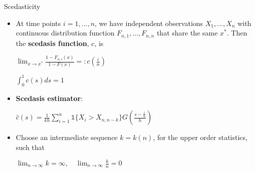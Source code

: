 \documentclass[notes]{beamer}
\begin{document}

\begin{frame}{Scedasticity}
\begin{itemize}
\item At time points $i=1, ... , n$, we have independent observations $X_1 , ... , X_n$ with continuous distribution function $F_{n,1} , ... , F_{n,n}$ that share the same $x^*$. Then the \textbf{scedasis function}, $c$, is
\begin{center} $ \displaystyle \lim_{x \rightarrow x^*} \frac{1-F_{n,i}(x)}{1-F(x)} =: c\left(\frac{i}{n}\right) $ \end{center}
\begin{center} $\int_0^1 c(s) ds = 1$ \end{center}
\item \textbf{Scedasis estimator}:
\begin{center} $\hat{c}(s) = \frac{1}{kh} \displaystyle \sum_{i=1}^{n} \mathbb{1}\{X_i > X_{n,n-k}\} G\left(\frac{s-\frac{i}{n}}{h}\right)$ \end{center}
\item Choose an intermediate sequence $k = k(n)$, for the upper order statistics, such that
\begin{center} $\displaystyle \lim_{n \rightarrow \infty} k = \infty, \quad \lim_{n \rightarrow \infty} \frac{k}{n} = 0$ \end{center}
\end{itemize}

\end{frame}
\end{document}
